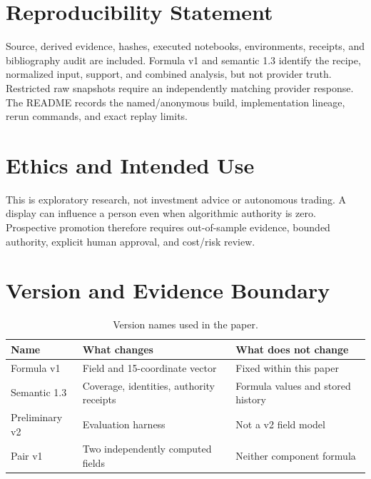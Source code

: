 \documentclass{article}
\begin{document}
\section*{Reproducibility Statement}

Source, derived evidence, hashes, executed notebooks, environments, receipts, and bibliography audit are included. Formula v1 and semantic 1.3 identify the recipe, normalized input, support, and combined analysis, but not provider truth. Restricted raw snapshots require an independently matching provider response. The README records the named/anonymous build, implementation lineage, rerun commands, and exact replay limits.

\section*{Ethics and Intended Use}

This is exploratory research, not investment advice or autonomous trading. A display can influence a person even when algorithmic authority is zero. Prospective promotion therefore requires out-of-sample evidence, bounded authority, explicit human approval, and cost/risk review.




\appendix

\section{Version and Evidence Boundary}
\label{app:versions}

\begin{table}[h]
\centering
\small
\setlength{\tabcolsep}{4pt}
\begin{tabular}{lll}
\toprule
Name & What changes & What does not change \\
\midrule
Formula v1 & Field and 15-coordinate vector & Fixed within this paper \\
Semantic 1.3 & Coverage, identities, authority receipts & Formula values and stored history \\
Preliminary v2 & Evaluation harness & Not a v2 field model \\
Pair v1 & Two independently computed fields & Neither component formula \\
\bottomrule
\end{tabular}
\caption{Version names used in the paper.}
\label{tab:versions}
\end{table}
\end{document}
